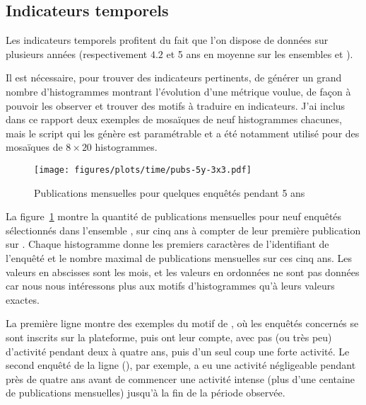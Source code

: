 \subsection{Indicateurs temporels}

Les indicateurs temporels profitent du fait que l’on dispose de données sur
plusieurs années (respectivement $4.2$ et 5 ans en moyenne sur les ensembles
\csa{} et \nocsa{}).

Il est nécessaire, pour trouver des indicateurs pertinents, de générer un grand
nombre d’histogrammes montrant l’évolution d’une métrique voulue, de façon à
pouvoir les observer et trouver des motifs à traduire en indicateurs. J’ai
inclus dans ce rapport deux exemples de mosaïques de neuf histogrammes
chacunes, mais le script qui les génère est paramétrable et a été notamment
utilisé pour des mosaïques de $8\times20$ histogrammes.

\begin{figure}[ht]
    \label{indicators:pubs}
    \begin{center}
        \texttt{[image: figures/plots/time/pubs-5y-3x3.pdf]}
    \end{center}
    \caption{Publications mensuelles pour quelques enquêtés pendant 5 ans}
\end{figure}

La figure~\ref{indicators:pubs} montre la quantité de publications mensuelles
pour neuf enquêtés sélectionnés dans l’ensemble \csa{}, sur cinq ans à compter
de leur première publication sur \fb{}. Chaque histogramme donne les premiers
caractères de l’identifiant de l’enquêté et le nombre maximal de publications
mensuelles sur ces cinq ans. Les valeurs en abscisses sont les mois, et les
valeurs en ordonnées ne sont pas données car nous nous intéressons plus aux
motifs d’histogrammes qu’à leurs valeurs exactes.

La première ligne montre des exemples du motif de , où les
enquêtés concernés se sont inscrits sur la plateforme, puis ont  leur
compte, avec pas (ou très peu) d’activité pendant deux à quatre ans, puis d’un
seul coup une forte activité. Le second enquêté de la ligne (),
par exemple, a eu une activité négligeable pendant près de quatre ans avant de
commencer une activité intense (plus d’une centaine de publications mensuelles)
jusqu’à la fin de la période observée.


